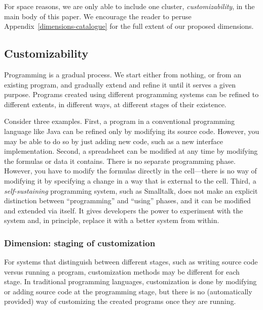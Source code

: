 For space reasons, we are only able to include one cluster,
\emph{customizability}, in the main body of this paper. We encourage the
reader to peruse Appendix~\ref{dimensions-catalogue} for the full extent
of our proposed dimensions.

\hypertarget{customizability}{%
\subsection{Customizability}\label{customizability}}


Programming is a gradual process. We start either from nothing, or from
an existing program, and gradually extend and refine it until it serves
a given purpose. Programs created using different programming systems
can be refined to different extents, in different ways, at different
stages of their existence.



Consider three examples. First, a program in a conventional programming
language like Java can be refined only by modifying its source code.
However, you may be able to do so by just adding new code, such as a new
interface implementation. Second, a spreadsheet can be modified at any
time by modifying the formulas or data it contains. There is no separate
programming phase. However, you have to modify the formulas directly in
the cell---there is no way of modifying it by specifying a change in a
way that is external to the cell. Third, a \emph{self-sustaining}
programming system, such as Smalltalk, does not make an explicit
distinction between ``programming'' and ``using'' phases, and it can be
modified and extended via itself. It gives developers the power to
experiment with the system and, in principle, replace it with a better
system from within.

\hypertarget{dimension-staging-of-customization}{%
\subsubsection{Dimension: staging of
customization}\label{dimension-staging-of-customization}}

For systems that distinguish between different stages, such as writing
source code versus running a program, customization methods may be
different for each stage. In traditional programming languages,
customization is done by modifying or adding source code at the
programming stage, but there is no (automatically provided) way of
customizing the created programs once they are running.

